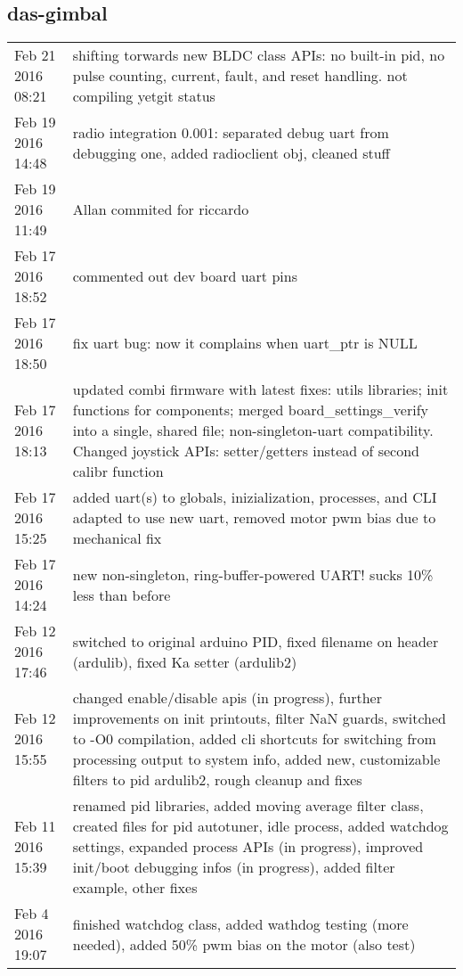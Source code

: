 \subsection{das-gimbal}

\begin{tabular}{ l || p{12cm} }
	\hline			
	Feb 21 2016 08:21	& shifting torwards new BLDC class APIs: no built-in pid, no pulse counting, current, fault, and reset handling. not compiling yetgit status	\\
	Feb 19 2016 14:48	& radio integration 0.001: separated debug uart from debugging one, added radioclient obj, cleaned stuff	\\
	Feb 19 2016 11:49	& Allan commited for riccardo	\\
	Feb 17 2016 18:52	& commented out dev board uart pins	\\
	Feb 17 2016 18:50	& fix uart bug: now it complains when uart_ptr is NULL	\\
	Feb 17 2016 18:13	& updated combi firmware with latest fixes: utils libraries; init functions for components; merged board_settings_verify into a single, shared file; non-singleton-uart compatibility. Changed joystick APIs: setter/getters instead of second calibr function	\\
	Feb 17 2016 15:25	& added uart(s) to globals, inizialization, processes, and CLI adapted to use new uart, removed motor pwm bias due to mechanical fix	\\
	Feb 17 2016 14:24	& new non-singleton, ring-buffer-powered UART! sucks 10\% less than before	\\
	Feb 12 2016 17:46	& switched to original arduino PID, fixed filename on header (ardulib), fixed Ka setter (ardulib2)	\\
	Feb 12 2016 15:55	& changed enable/disable apis (in progress), further improvements on init printouts, filter NaN guards, switched to -O0 compilation, added cli shortcuts for switching from processing output to system info, added new, customizable filters to pid ardulib2, rough cleanup and fixes	\\
	Feb 11 2016 15:39	& renamed pid libraries, added moving average filter class, created files for pid autotuner, idle process, added watchdog settings, expanded process APIs (in progress), improved init/boot debugging infos (in progress), added filter example, other fixes	\\
	Feb 4 2016 19:07	& finished watchdog class, added wathdog testing (more needed), added 50\% pwm bias on the motor (also test)	\\

\end{tabular}
